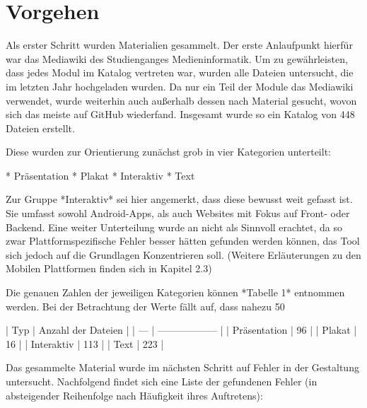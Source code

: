 
\section{Vorgehen}
Als erster Schritt wurden Materialien gesammelt. Der erste Anlaufpunkt hierfür war das Mediawiki des Studienganges Medieninformatik. Um zu gewährleisten, dass jedes Modul im Katalog vertreten war, wurden alle Dateien untersucht, die im letzten Jahr hochgeladen wurden.
Da nur ein Teil der Module das Mediawiki verwendet, wurde weiterhin auch außerhalb dessen nach Material gesucht, wovon sich das meiste auf GitHub wiederfand.
Insgesamt wurde so ein Katalog von 448 Dateien erstellt.

Diese wurden zur Orientierung zunächst grob in vier Kategorien unterteilt:

* Präsentation
* Plakat
* Interaktiv
* Text

Zur Gruppe *Interaktiv* sei hier angemerkt, dass diese bewusst weit gefasst ist. Sie umfasst sowohl Android-Apps, als auch Websites mit Fokus auf Front- oder Backend.
Eine weiter Unterteilung wurde an nicht als Sinnvoll erachtet, da so zwar Plattformspezifische Fehler besser hätten gefunden werden können, das Tool sich jedoch auf die Grundlagen Konzentrieren soll. (Weitere Erläuterungen zu den Mobilen Plattformen finden sich in Kapitel 2.3)

Die genauen Zahlen der jeweiligen Kategorien können *Tabelle 1* entnommen werden. Bei der Betrachtung der Werte fällt auf, dass nahezu 50%

| Typ | Anzahl der Dateien |
| --- | ------------------ |
| Präsentation | 96 |
| Plakat | 16 |
| Interaktiv | 113 |
| Text | 223 |

Das gesammelte Material wurde im nächsten Schritt auf Fehler in der Gestaltung untersucht. Nachfolgend findet sich eine Liste der gefundenen Fehler (in absteigender Reihenfolge nach Häufigkeit ihres Auftretens):

